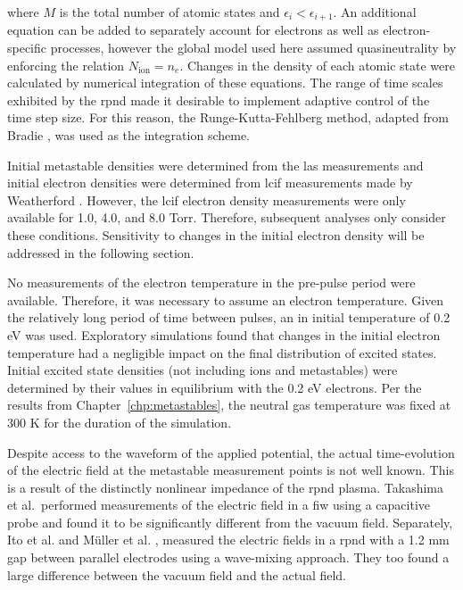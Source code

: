 where $M$ is the total number of atomic states and $\epsilon_i <
\epsilon_{i+1}$. An additional equation can be added to separately account for
electrons as well as electron-specific processes, however the global model used
here assumed quasineutrality by enforcing the relation $N_\mathrm{ion}=n_e$.
Changes in the density of each atomic state were calculated by numerical
integration of these equations. The range of time scales exhibited by the
\acs{rpnd} made it desirable to implement adaptive control of the time step
size. For this reason, the Runge-Kutta-Fehlberg method, adapted from Bradie
\cite{Bradie2006}, was used as the integration scheme.

Initial metastable densities were determined from the \acs{las} measurements and
initial electron densities were determined from \acs{lcif} measurements made by
Weatherford \cite{Weatherford2012a}. However, the \acs{lcif} electron density
measurements were only available for 1.0, 4.0, and 8.0 Torr. Therefore,
subsequent analyses only consider these conditions. Sensitivity to changes in
the initial electron density will be addressed in the following section.

No measurements of the electron temperature in the pre-pulse period were
available. Therefore, it was necessary to assume an electron temperature. Given
the relatively long period of time between pulses, an in initial temperature of
0.2 eV was used. Exploratory simulations found that changes in the initial
electron temperature had a negligible impact on the final distribution of
excited states. Initial excited state densities (not including ions and
metastables) were determined by their values in equilibrium with the 0.2 eV
electrons. Per the results from Chapter~\ref{chp:metastables}, the neutral gas
temperature was fixed at 300 K for the duration of the simulation.

Despite access to the waveform of the applied potential, the actual
time-evolution of the electric field at the metastable measurement points is not
well known. This is a result of the distinctly nonlinear impedance of the
\acs{rpnd} plasma. Takashima et al.\ performed measurements of the electric
field in a \acs{fiw} using a capacitive probe and found it to be significantly
different from the vacuum field. Separately, Ito et al. \cite{Ito2010} and
M\"{u}ller et al. \cite{Muller2011a}, measured the electric fields in a
\acs{rpnd} with a 1.2 mm gap between parallel electrodes using a wave-mixing
approach. They too found a large difference between the vacuum field and the
actual field.

